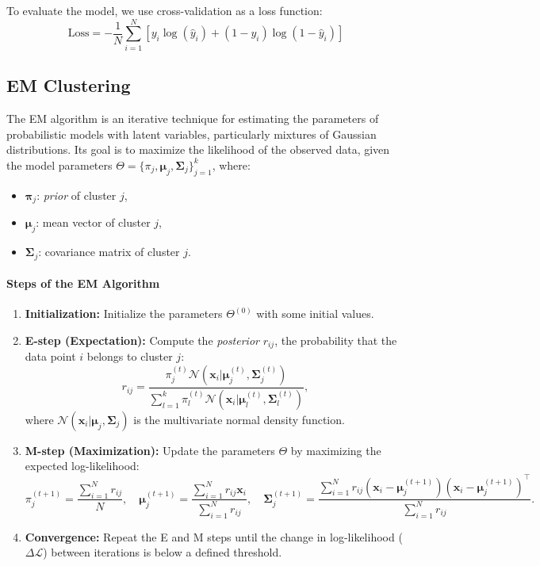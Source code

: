 \documentclass[a4paper,12pt]{article}
\begin{document}
To evaluate the model, we use cross-validation as a loss function:
\[
\text{Loss} = -\frac{1}{N} \sum_{i=1}^{N} \left[ y_i \log(\hat{y}_i) + (1-y_i) \log(1-\hat{y}_i) \right]
\]

\subsection{EM Clustering}
The EM algorithm is an iterative technique for estimating the parameters of probabilistic models with latent variables, particularly mixtures of Gaussian distributions. Its goal is to maximize the likelihood of the observed data, given the model parameters \(\Theta = \{\pi_j, \boldsymbol{\mu}_j, \boldsymbol{\Sigma}_j\}_{j=1}^k\), where:  
\begin{itemize}
    \item \(\boldsymbol{\pi}_j\): \textit{prior} of cluster \(j\),
    \item \(\boldsymbol{\mu}_j\): mean vector of cluster \(j\),
    \item \(\boldsymbol{\Sigma}_j\): covariance matrix of cluster \(j\).
\end{itemize}

\paragraph{Steps of the EM Algorithm}
\begin{enumerate}
    \item \textbf{Initialization:} Initialize the parameters \(\Theta^{(0)}\) with some initial values.
    \item \textbf{E-step (Expectation):} Compute the \textit{posterior} \(r_{ij}\), the probability that the data point \(i\) belongs to cluster \(j\):
    \[
    r_{ij} = \frac{\pi_j^{(t)} \mathcal{N}(\mathbf{x}_i | \boldsymbol{\mu}_j^{(t)}, \boldsymbol{\Sigma}_j^{(t)})}{\sum_{l=1}^k \pi_l^{(t)} \mathcal{N}(\mathbf{x}_i | \boldsymbol{\mu}_l^{(t)}, \boldsymbol{\Sigma}_l^{(t)})},
    \]
    where \(\mathcal{N}(\mathbf{x}_i | \boldsymbol{\mu}_j, \boldsymbol{\Sigma}_j)\) is the multivariate normal density function.
    
    \item \textbf{M-step (Maximization):} Update the parameters \(\Theta\) by maximizing the expected log-likelihood:
    \[
    \pi_j^{(t+1)} = \frac{\sum_{i=1}^N r_{ij}}{N}, \quad
    \boldsymbol{\mu}_j^{(t+1)} = \frac{\sum_{i=1}^N r_{ij} \mathbf{x}_i}{\sum_{i=1}^N r_{ij}}, \quad
    \boldsymbol{\Sigma}_j^{(t+1)} = \frac{\sum_{i=1}^N r_{ij} (\mathbf{x}_i - \boldsymbol{\mu}_j^{(t+1)})(\mathbf{x}_i - \boldsymbol{\mu}_j^{(t+1)})^\top}{\sum_{i=1}^N r_{ij}}.
    \]

    \item \textbf{Convergence:} Repeat the E and M steps until the change in log-likelihood (\(\Delta \mathcal{L}\)) between iterations is below a defined threshold.
\end{enumerate}
\end{document}
